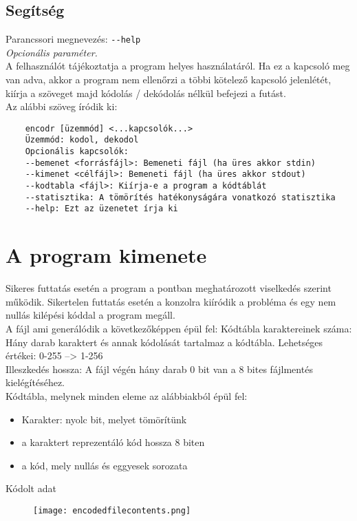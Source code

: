 \subsection{Segítség}
Parancssori megnevezés: \texttt{-{}-help} \\
{\it Opcionális paraméter.}\\
A felhasználót tájékoztatja a program helyes használatáról. Ha ez a kapcsoló meg van adva, akkor a program nem ellenőrzi
a többi kötelező kapcsoló jelenlétét, kiírja a szöveget majd kódolás / dekódolás nélkül befejezi a futást.\\
Az alábbi szöveg íródik ki: \\
\begin{verbatim}    
    encodr [üzemmód] <...kapcsolók...>
    Üzemmód: kodol, dekodol
    Opcionális kapcsolók:
    --bemenet <forrásfájl>: Bemeneti fájl (ha üres akkor stdin)
    --kimenet <célfájl>: Bemeneti fájl (ha üres akkor stdout)
    --kodtabla <fájl>: Kiírja-e a program a kódtáblát
    --statisztika: A tömörítés hatékonyságára vonatkozó statisztika
    --help: Ezt az üzenetet írja ki
\end{verbatim}


\section{A program kimenete}
Sikeres futtatás esetén a program a  pontban meghatározott viselkedés szerint működik.
Sikertelen futtatás esetén a konzolra kiíródik a probléma és egy nem nullás kilépési kóddal a program megáll. \\
A fájl ami generálódik a következőképpen épül fel:
Kódtábla karaktereinek száma: Hány darab karaktert és annak kódolását tartalmaz a kódtábla. Lehetséges értékei: 0-255 --> 1-256 \\
Illeszkedés hossza: A fájl végén hány darab 0 bit van a 8 bites fájlmentés kielégítéséhez. \\
Kódtábla, melynek minden eleme az alábbiakból épül fel:\\
\begin{itemize}
    \item Karakter: nyolc bit, melyet tömörítünk
    \item a karaktert reprezentáló kód hossza 8 biten
    \item a kód, mely nullás és eggyesek sorozata
\end{itemize}
Kódolt adat

\begin{figure}[H]
    \centerline{\texttt{[image: encodedfilecontents.png]}}
\end{figure}